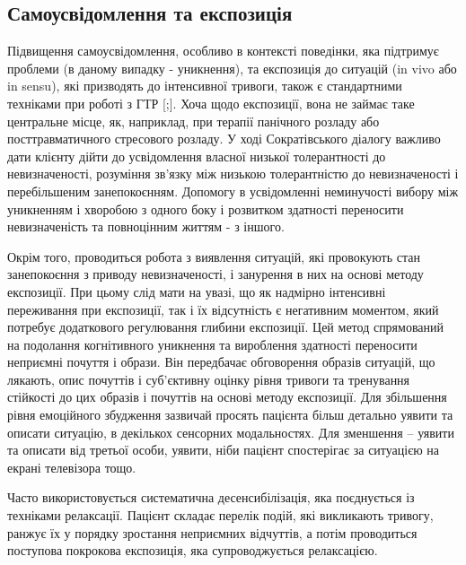 \documentclass[twocolumn]{article}
\begin{document}
\subsection {Самоусвідомлення та експозиція}
\par Підвищення самоусвідомлення, особливо в контексті поведінки, яка підтримує проблеми (в даному випадку - уникнення), та експозиція до ситуацій (in vivo або in sensu), які призводять до інтенсивної тривоги, також є стандартними техніками при роботі з ГТР [\cite{bib17};\cite{bib18}].  Хоча щодо експозиції, вона не займає таке центральне місце, як, наприклад, при терапії панічного розладу або посттравматичного стресового розладу. У ході Сократівського діалогу важливо дати клієнту дійти до усвідомлення власної низької толерантності до невизначеності, розуміння зв'язку між низькою толерантністю до невизначеності і перебільшеним занепокоєнням. Допомогу в усвідомленні неминучості вибору між уникненням і хворобою з одного боку і розвитком здатності переносити невизначеність та повноцінним життям - з іншого.
\par Окрім того, проводиться робота з виявлення ситуацій, які провокують стан занепокоєння з приводу невизначеності, і занурення в них на основі методу експозиції. При цьому слід мати на увазі, що як надмірно інтенсивні переживання при експозиції, так і їх відсутність є негативним моментом, який потребує додаткового регулювання глибини експозиції. Цей метод спрямований на подолання когнітивного уникнення та вироблення здатності переносити неприємні почуття і образи. Він передбачає обговорення образів ситуацій, що лякають, опис почуттів і суб'єктивну оцінку рівня тривоги та тренування стійкості до цих образів і почуттів на основі методу експозиції. Для збільшення рівня емоційного збудження зазвичай просять пацієнта більш детально уявити та описати ситуацію, в декількох сенсорних модальностях. Для зменшення – уявити та описати від третьої особи, уявити, ніби пацієнт спостерігає за ситуацією на екрані телевізора тощо.
\par Часто використовується систематична десенсибілізація, яка поєднується із техніками релаксації. Пацієнт складає перелік подій, які викликають тривогу, ранжує їх у порядку зростання неприємних відчуттів, а потім проводиться поступова покрокова експозиція, яка супроводжується релаксацією.
\end{document}

